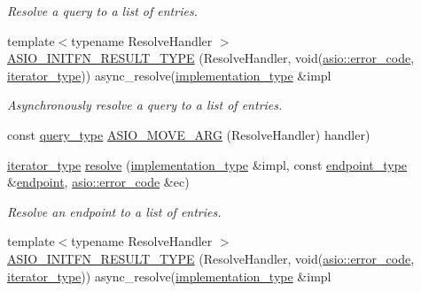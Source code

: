 \begin{DoxyCompactItemize}
\begin{DoxyCompactList}\small\item\em Resolve a query to a list of entries. \end{DoxyCompactList}\item 
{\footnotesize template$<$typename Resolve\+Handler $>$ }\\\hyperlink{classasio_1_1ip_1_1resolver__service_a5deb51214b82e88c2d509bffea5bcd85}{A\+S\+I\+O\+\_\+\+I\+N\+I\+T\+F\+N\+\_\+\+R\+E\+S\+U\+L\+T\+\_\+\+T\+Y\+P\+E} (Resolve\+Handler, void(\hyperlink{classasio_1_1error__code}{asio\+::error\+\_\+code}, \hyperlink{classasio_1_1ip_1_1resolver__service_a7b71bd80a7d9296ac334251bed0e2b4c}{iterator\+\_\+type})) async\+\_\+resolve(\hyperlink{classasio_1_1ip_1_1resolver__service_aa686664be9b5626ca662d4603ae3459b}{implementation\+\_\+type} \&impl
\begin{DoxyCompactList}\small\item\em Asynchronously resolve a query to a list of entries. \end{DoxyCompactList}\item 
const \hyperlink{classasio_1_1ip_1_1resolver__service_a60008f0c960687605c978dff14011145}{query\+\_\+type} \hyperlink{classasio_1_1ip_1_1resolver__service_a507fca5ddbd2b81a5a52da889f8da172}{A\+S\+I\+O\+\_\+\+M\+O\+V\+E\+\_\+\+A\+R\+G} (Resolve\+Handler) handler)
\item 
\hyperlink{classasio_1_1ip_1_1resolver__service_a7b71bd80a7d9296ac334251bed0e2b4c}{iterator\+\_\+type} \hyperlink{classasio_1_1ip_1_1resolver__service_a5db6e4df1a36cc3773c1ac331eea1eab}{resolve} (\hyperlink{classasio_1_1ip_1_1resolver__service_aa686664be9b5626ca662d4603ae3459b}{implementation\+\_\+type} \&impl, const \hyperlink{classasio_1_1ip_1_1resolver__service_aa51d73a98d9f6a1df7ca69a419fa7bc3}{endpoint\+\_\+type} \&\hyperlink{classasio_1_1ip_1_1resolver__service_a14162d17bcfa5a3e87b455caca632986}{endpoint}, \hyperlink{classasio_1_1error__code}{asio\+::error\+\_\+code} \&ec)
\begin{DoxyCompactList}\small\item\em Resolve an endpoint to a list of entries. \end{DoxyCompactList}\item 
{\footnotesize template$<$typename Resolve\+Handler $>$ }\\\hyperlink{classasio_1_1ip_1_1resolver__service_a5deb51214b82e88c2d509bffea5bcd85}{A\+S\+I\+O\+\_\+\+I\+N\+I\+T\+F\+N\+\_\+\+R\+E\+S\+U\+L\+T\+\_\+\+T\+Y\+P\+E} (Resolve\+Handler, void(\hyperlink{classasio_1_1error__code}{asio\+::error\+\_\+code}, \hyperlink{classasio_1_1ip_1_1resolver__service_a7b71bd80a7d9296ac334251bed0e2b4c}{iterator\+\_\+type})) async\+\_\+resolve(\hyperlink{classasio_1_1ip_1_1resolver__service_aa686664be9b5626ca662d4603ae3459b}{implementation\+\_\+type} \&impl

\end{DoxyCompactItemize}
